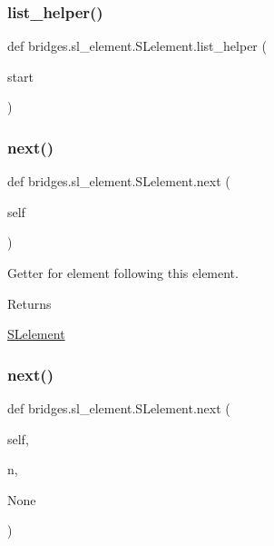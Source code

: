 \subsubsection{\texorpdfstring{list\+\_\+helper()}{list\_helper()}}
{\footnotesize\ttfamily def bridges.\+sl\+\_\+element.\+S\+Lelement.\+list\+\_\+helper (\begin{DoxyParamCaption}\item[{}]{start }\end{DoxyParamCaption})}

\mbox{\label{classbridges_1_1sl__element_1_1_s_lelement_acef793fc5e2533fb91795d01904e8b6d}} 
\subsubsection{\texorpdfstring{next()}{next()}\hspace{0.1cm}{\footnotesize\ttfamily [1/2]}}
{\footnotesize\ttfamily def bridges.\+sl\+\_\+element.\+S\+Lelement.\+next (\begin{DoxyParamCaption}\item[{}]{self }\end{DoxyParamCaption})}



Getter for element following this element. 

\begin{DoxyReturn}{Returns}


\hyperlink{classbridges_1_1sl__element_1_1_s_lelement}{S\+Lelement} 
\end{DoxyReturn}
\mbox{\label{classbridges_1_1sl__element_1_1_s_lelement_af7cdff0e4a93e1fbbcb7f92741fe4c7b}} 
\subsubsection{\texorpdfstring{next()}{next()}\hspace{0.1cm}{\footnotesize\ttfamily [2/2]}}
{\footnotesize\ttfamily def bridges.\+sl\+\_\+element.\+S\+Lelement.\+next (\begin{DoxyParamCaption}\item[{}]{self,  }\item[{}]{n,  }\item[{}]{None }\end{DoxyParamCaption})}



